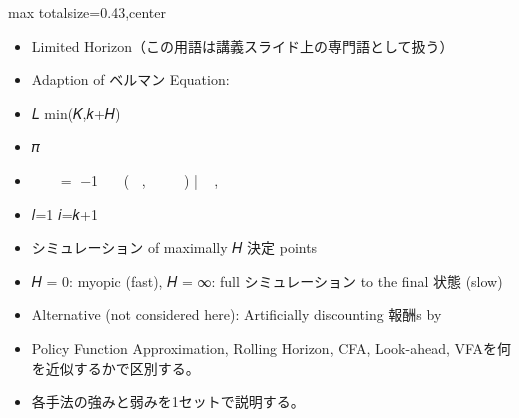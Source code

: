 \clearpage
{}
\begin{minipage}[t]{0.405\textwidth}
\begin{adjustbox}{max totalsize={\textwidth}{0.43\textheight},center}
\begin{minipage}{\textwidth}\scriptsize
{}\begin{itemize}
\item Limited Horizon（この用語は講義スライド上の専門語として扱う）
\item Adaption of ベルマン Equation:
\item 𝐿 min(𝐾,𝑘+𝐻)
\item 𝜋
\item 𝑉෠ 𝑆𝑘𝑥 = 𝐿−1 ෍ ෍ 𝑅(𝑆𝑖 , 𝑋𝑖 𝑏 𝑆𝑖 ) |𝑆𝑘𝑥 , 𝜔𝑙
\item 𝑙=1 𝑖=𝑘+1
\item シミュレーション of maximally 𝐻 決定 points
\item 𝐻 = 0: myopic (fast), 𝐻 = ∞: full シミュレーション to the final 状態 (slow)
\item Alternative (not considered here): Artificially discounting 報酬s by
\end{itemize}\begin{itemize}
\item Policy Function Approximation, Rolling Horizon, CFA, Look-ahead, VFAを何を近似するかで区別する。
\item 各手法の強みと弱みを1セットで説明する。
\end{itemize}
\end{minipage}
\end{adjustbox}
\end{minipage}\hfill
